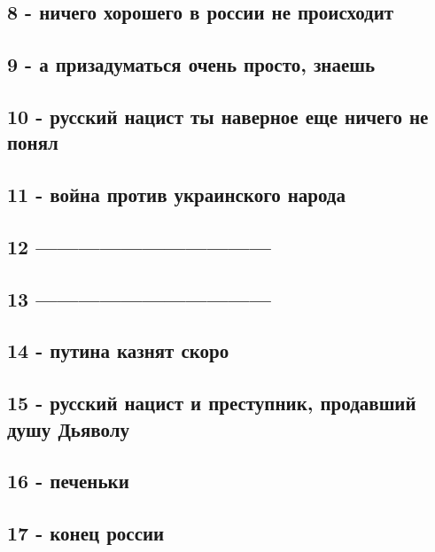 \subsection{8 - ничего хорошего в россии не происходит}

\subsection{9 - а призадуматься очень просто, знаешь}

\subsection{10 - русский нацист ты наверное еще ничего не понял}

\subsection{11 - война против украинского народа}

\subsection{12 ---------------------------------}

\subsection{13 ---------------------------------}

\subsection{14 - путина казнят скоро}

\subsection{15 - русский нацист и преступник, продавший душу Дьяволу}

\subsection{16 - печеньки}

\subsection{17 - конец россии}

